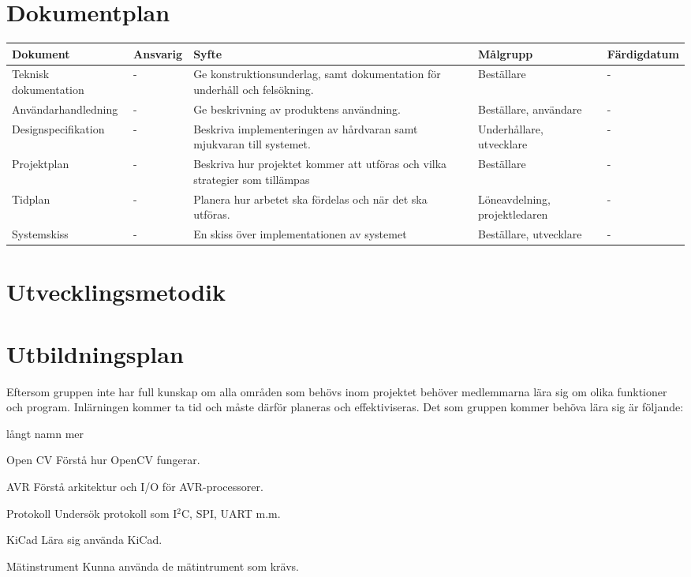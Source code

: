 \documentclass[projektplan/plan.tex]{subfiles}
\begin{document}
\section{Dokumentplan}
{\renewcommand{\arraystretch}{1.6}
\begin{longtable}{p{4.5cm}p{1.5cm}p{5cm}p{2.2cm}p{1.2cm}}
    \bfseries Dokument &
    \bfseries Ansvarig &
    \bfseries Syfte &
    \bfseries Målgrupp &
    \bfseries Färdigdatum \\\hline
    Teknisk dokumentation &
    - &
    Ge konstruktionsunderlag, samt dokumentation för underhåll och
    felsökning. &
    Beställare &
    -
    \\
    Användarhandledning &
    - &
    Ge beskrivning av produktens användning. &
    Beställare, användare &
    -
    \\
    Designspecifikation &
    - &
    Beskriva implementeringen av hårdvaran samt mjukvaran till systemet. &
    Underhållare, utvecklare &
    -
    \\
    Projektplan &
    - &
    Beskriva hur projektet kommer att utföras och vilka strategier som
    tillämpas &
    Beställare &
    -
    \\
    Tidplan &
    - &
    Planera hur arbetet ska fördelas och när det ska utföras. &
    Löne\-avdelning, projekt\-ledaren &
    -
    \\
    Systemskiss &
    - &
    En skiss över implementationen av systemet &
    Beställare, utvecklare &
    -
    \\
    
    \endhead
\end{longtable}}


\section{Utvecklingsmetodik} 


\section{Utbildningsplan}
Eftersom gruppen inte har full kunskap om alla områden som behövs inom projektet behöver medlemmarna lära sig om olika funktioner och program. Inlärningen kommer ta tid och måste därför planeras och effektiviseras. Det som gruppen kommer behöva lära sig är följande:

\begin{labeling}{långt namn mer}
    \item[Open CV] Förstå hur OpenCV fungerar.
    \item[AVR] Förstå arkitektur och I/O för
    AVR-processorer.
    \item[Protokoll] Undersök protokoll som
    I$^2$C, SPI, UART m.m.
    \item[KiCad] Lära sig använda KiCad.
    \item[Mätinstrument] Kunna använda de mätintrument som krävs.
\end{labeling}
\end{document}

